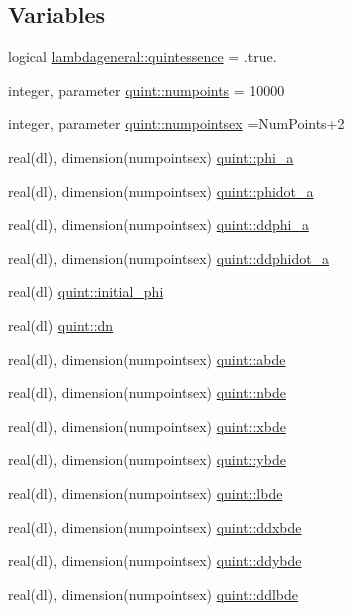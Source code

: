 \subsection*{Variables}
\begin{DoxyCompactItemize}
\item 
logical \mbox{\hyperlink{namespacelambdageneral_a089643a9b64fa595564ae2a20a525c0a}{lambdageneral\+::quintessence}} = .true.
\item 
integer, parameter \mbox{\hyperlink{namespacequint_ab17aada00a312b3af2e4e191fdf3e50e}{quint\+::numpoints}} = 10000
\item 
integer, parameter \mbox{\hyperlink{namespacequint_a8388814d2fb6e0f54431a7257a8f86a9}{quint\+::numpointsex}} =Num\+Points+2
\item 
real(dl), dimension(numpointsex) \mbox{\hyperlink{namespacequint_a061343360883da6eebfdb61cdfba449c}{quint\+::phi\+\_\+a}}
\item 
real(dl), dimension(numpointsex) \mbox{\hyperlink{namespacequint_a8719904f4c91dac880cb839088a69ca9}{quint\+::phidot\+\_\+a}}
\item 
real(dl), dimension(numpointsex) \mbox{\hyperlink{namespacequint_adb002db0bc26b007d62ea6582a5fc58f}{quint\+::ddphi\+\_\+a}}
\item 
real(dl), dimension(numpointsex) \mbox{\hyperlink{namespacequint_a4dd7a485719c132a01ed439f30c1f866}{quint\+::ddphidot\+\_\+a}}
\item 
real(dl) \mbox{\hyperlink{namespacequint_a7992ff4df2efe5528a1a109c6d0533db}{quint\+::initial\+\_\+phi}}
\item 
real(dl) \mbox{\hyperlink{namespacequint_af323f47cbdf135c3f3f626b07465f347}{quint\+::dn}}
\item 
real(dl), dimension(numpointsex) \mbox{\hyperlink{namespacequint_a32c8893957513fe23c9798bd01dd57bd}{quint\+::abde}}
\item 
real(dl), dimension(numpointsex) \mbox{\hyperlink{namespacequint_a772dd6340b969931fd8b4cc796e2ecee}{quint\+::nbde}}
\item 
real(dl), dimension(numpointsex) \mbox{\hyperlink{namespacequint_ac5553ef581fd33330e83b1849b3c90ff}{quint\+::xbde}}
\item 
real(dl), dimension(numpointsex) \mbox{\hyperlink{namespacequint_af164f7d3b20eb2e0ad7449519ada6734}{quint\+::ybde}}
\item 
real(dl), dimension(numpointsex) \mbox{\hyperlink{namespacequint_aea928c2d627a7d5001dfe09a898d0c21}{quint\+::lbde}}
\item 
real(dl), dimension(numpointsex) \mbox{\hyperlink{namespacequint_adc4851c280622a1d594cbcc28e15aba1}{quint\+::ddxbde}}
\item 
real(dl), dimension(numpointsex) \mbox{\hyperlink{namespacequint_a10a79a1d7070650f6f67d1de7fa4b34a}{quint\+::ddybde}}
\item 
real(dl), dimension(numpointsex) \mbox{\hyperlink{namespacequint_a64e99c9feaf4cb920180f5be428745a6}{quint\+::ddlbde}}
\end{DoxyCompactItemize}


